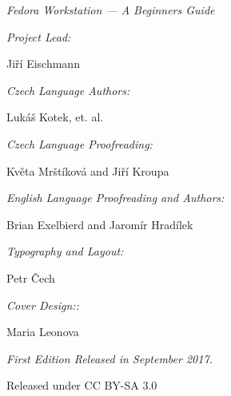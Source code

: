 \newpage\mbox{}\newpage
\begin{center}

{\it\large Fedora Workstation --- A Beginners Guide}

\bigskip

{\it Project Lead:}

Jiří Eischmann

{\it Czech Language Authors:}

Lukáš Kotek, et. al.

{\it Czech Language Proofreading:}

Květa Mrštíková and Jiří Kroupa

{\it English Language Proofreading and Authors:}

Brian Exelbierd and Jaromír Hradílek

{\it Typography and Layout:}

Petr Čech

{\it Cover Design::}

Maria Leonova

{\it First Edition Released in September 2017.

Released under CC BY-SA 3.0}
\end{center}

